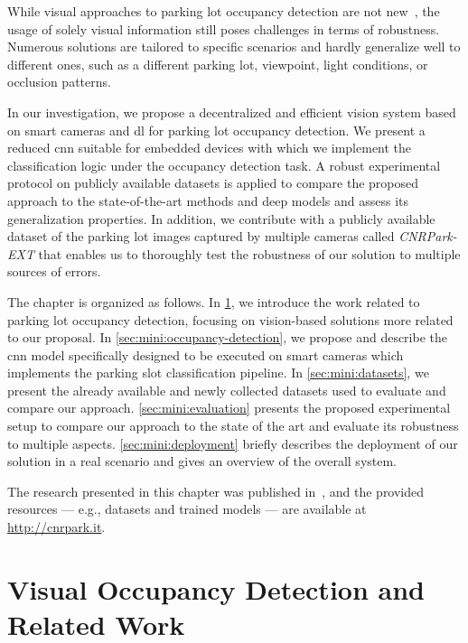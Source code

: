 %
While visual approaches to parking lot occupancy detection are not new~\cite{dan2002parking,wu2007robust,del2015vacant,de2015pklot}, the usage of solely visual information still poses challenges in terms of robustness.
Numerous solutions are tailored to specific scenarios and hardly generalize well to different ones, such as a different parking lot, viewpoint, light conditions, or occlusion patterns.

In our investigation, we propose a decentralized and efficient vision system based on smart cameras and \gls{dl} for parking lot occupancy detection.
We present a reduced \gls{cnn} suitable for embedded devices with which we implement the classification logic under the occupancy detection task.
A robust experimental protocol on publicly available datasets is applied to compare the proposed approach to the state-of-the-art methods and deep models and assess its generalization properties.
In addition, we contribute with a publicly available dataset of the parking lot images captured by multiple cameras called \emph{CNRPark-EXT} that enables us to thoroughly test the robustness of our solution to multiple sources of errors.

The chapter is organized as follows.
In \ref{sec:mini:related-work}, we introduce the work related to parking lot occupancy detection, focusing on vision-based solutions more related to our proposal.
In \ref{sec:mini:occupancy-detection}, we propose and describe the \gls{cnn} model specifically designed to be executed on smart cameras which implements the parking slot classification pipeline.
In \ref{sec:mini:datasets}, we present the already available and newly collected datasets used to evaluate and compare our approach.
\ref{sec:mini:evaluation} presents the proposed experimental setup to compare our approach to the state of the art and evaluate its robustness to multiple aspects.
\ref{sec:mini:deployment} briefly describes the deployment of our solution in a real scenario and gives an overview of the overall system.

The research presented in this chapter was published in~\cite{amato2016car,amato2017deep}, and the provided resources --- e.g., datasets and trained models --- are available at \url{http://cnrpark.it}.

\section{Visual Occupancy Detection and Related Work}
\label{sec:mini:related-work}

